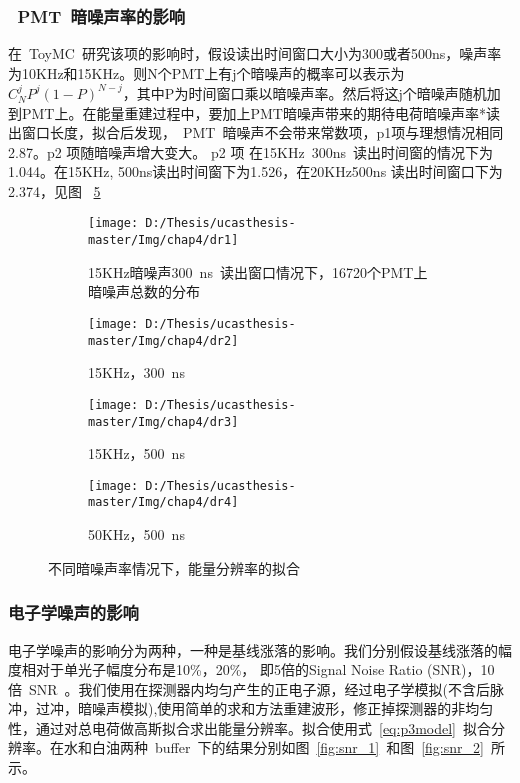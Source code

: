 \subsubsection{~PMT~暗噪声率的影响}
在~ToyMC~研究该项的影响时，假设读出时间窗口大小为300或者500ns，噪声率为10KHz和15KHz。则N个PMT上有j个暗噪声的概率可以表示为$C_N^jP^j(1-P)^{N-j}$，其中P为时间窗口乘以暗噪声率。然后将这j个暗噪声随机加到PMT上。在能量重建过程中，要加上PMT暗噪声带来的期待电荷暗噪声率*读出窗口长度，拟合后发现，~PMT~暗噪声不会带来常数项，p1项与理想情况相同2.87。p2 项随暗噪声增大变大。 p2 项 在15KHz~300ns~读出时间窗的情况下为 1.044。在15KHz, 500ns读出时间窗下为1.526，在20KHz500ns 读出时间窗口下为2.374，见图 ~\ref{fig:dr}~
 \begin{figure}[!htbp]
  \centering
  \begin{subfigure}[b]{\MySubFactor\textwidth}
    \texttt{[image: D:/Thesis/ucasthesis-master/Img/chap4/dr1]}
    \caption{15KHz暗噪声300~ns~读出窗口情况下，16720个PMT上暗噪声总数的分布}
    \label{fig:dr_1}
  \end{subfigure}%
  \quad\quad\quad\quad\quad\quad%
  \begin{subfigure}[b]{\MySubFactor\textwidth}
    \texttt{[image: D:/Thesis/ucasthesis-master/Img/chap4/dr2]}
    \caption{15KHz，300~ns~}
    \label{fig:dr_2}
  \end{subfigure}
  \begin{subfigure}[b]{\MySubFactor\textwidth}
    \texttt{[image: D:/Thesis/ucasthesis-master/Img/chap4/dr3]}
    \caption{15KHz，500~ns~}
    \label{fig:dr_3}
  \end{subfigure}%
  \quad\quad\quad\quad\quad\quad%
  \begin{subfigure}[b]{\MySubFactor\textwidth}
    \texttt{[image: D:/Thesis/ucasthesis-master/Img/chap4/dr4]}
    \caption{50KHz，500~ns~}
    \label{fig:dr_4}
  \end{subfigure}
  \caption{不同暗噪声率情况下，能量分辨率的拟合}
  \label{fig:dr}
\end{figure}



\subsubsection{电子学噪声的影响}
电子学噪声的影响分为两种，一种是基线涨落的影响。我们分别假设基线涨落的幅度相对于单光子幅度分布是10\%，20\%，
即5倍的Signal Noise Ratio (SNR)，10倍~SNR~。我们使用在探测器内均匀产生的正电子源，经过电子学模拟(不含后脉冲，过冲，暗噪声模拟),使用简单的求和方法重建波形，修正掉探测器的非均匀性，通过对总电荷做高斯拟合求出能量分辨率。拟合使用式~\ref{eq:p3model}~拟合分辨率。在水和白油两种~buffer~下的结果分别如图~\ref{fig:snr_1}~和图~\ref{fig:snr_2}~所示。

